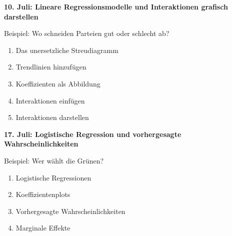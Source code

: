 \documentclass[11pt,]{scrartcl}
\providecommand{\tightlist}{%
   \setlength{\itemsep}{0pt}\setlength{\parskip}{0pt}}
\begin{document}
\textbf{10. Juli: Lineare Regressionsmodelle und Interaktionen grafisch
darstellen}

Beispiel: Wo schneiden Parteien gut oder schlecht ab?

\begin{enumerate}
\def\labelenumi{\alph{enumi})}
\tightlist
\item
  Das unersetzliche Streudiagramm
\item
  Trendlinien hinzufügen
\item
  Koeffizienten als Abbildung
\item
  Interaktionen einfügen
\item
  Interaktionen darstellen
\end{enumerate}

\textbf{17. Juli: Logistische Regression und vorhergesagte
Wahrscheinlichkeiten}

Beispiel: Wer wählt die Grünen?

\begin{enumerate}
\def\labelenumi{\alph{enumi})}
\tightlist
\item
  Logistische Regressionen
\item
  Koeffizientenplots
\item
  Vorhergesagte Wahrscheinlichkeiten
\item
  Marginale Effekte
\end{enumerate}
	
	
	
	
			
\end{document}
